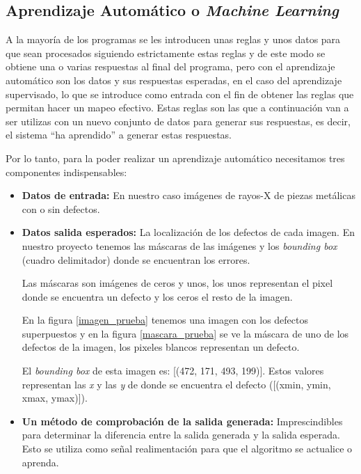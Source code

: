 \subsection{Aprendizaje Automático o \textit{Machine Learning}}

A la mayoría de los programas se les introducen unas reglas y unos datos para que sean procesados siguiendo estrictamente estas reglas y de este modo se obtiene una o varias respuestas al final del programa, pero con el aprendizaje automático son los datos y sus respuestas esperadas, en el caso del aprendizaje supervisado, lo que se introduce como entrada con el fin de obtener las reglas que permitan hacer un mapeo efectivo. Estas reglas son las que a continuación van a ser utilizas con un nuevo conjunto de datos para generar sus respuestas, es decir, el sistema ``ha aprendido'' a generar estas respuestas.

Por lo tanto, para la poder realizar un aprendizaje automático necesitamos tres componentes indispensables:

\begin{itemize}
    \item \textbf{Datos de entrada:} En nuestro caso imágenes de rayos-X de piezas metálicas con o sin defectos.
    \item \textbf{Datos salida esperados:} La localización de los defectos de cada imagen. En nuestro proyecto tenemos las máscaras de las imágenes y los \textit{bounding box} (cuadro delimitador) donde se encuentran los errores.
    
    Las máscaras son imágenes de ceros y unos, los unos representan el pixel donde se encuentra un defecto y los ceros el resto de la imagen.
    
    
    
    En la figura \ref{imagen_prueba} tenemos una imagen con los defectos superpuestos y en la figura \ref{mascara_prueba} se ve la máscara de uno de los defectos de la imagen, los pixeles blancos representan un defecto.
    
    El \textit{bounding box} de esta imagen es: [(472, 171, 493, 199)]. Estos valores representan las \textit{x} y las \textit{y} de donde se encuentra el defecto ([(xmin, ymin, xmax, ymax)]).
    \item \textbf{Un método de comprobación de la salida generada:} Imprescindibles para determinar la diferencia entre la salida generada y la salida esperada. Esto se utiliza como señal realimentación para que el algoritmo se actualice o aprenda.
\end{itemize}

